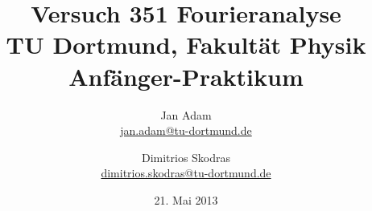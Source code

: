 



\title{Versuch 351 Fourieranalyse\\				%
\large TU Dortmund, Fakultät Physik\\ 
\normalsize Anfänger-Praktikum}

\author{Jan Adam\\			%
{\small \href{jan.adam@tu-dortmund.de}{jan.adam@tu-dortmund.de}}	%
\and						%
Dimitrios Skodras\\					%
{\small \href{dimitrios.skodras@tu-dortmund.de}{dimitrios.skodras@tu-dortmund.de}}		%
}
\date{21. Mai 2013}				%





\maketitle					%
\thispagestyle{empty} 				%



\tableofcontents


\newpage					%


